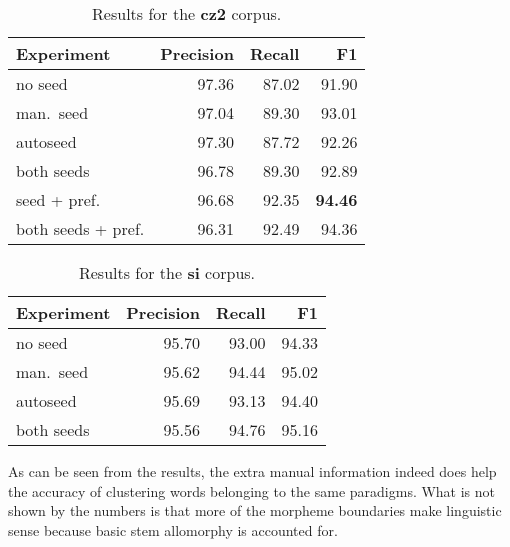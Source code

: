 \documentclass[11pt]{article}
\begin{document}
\begin{table}[h]
\begin{center}
\begin{tabular}{|l|r|r|r|}
\hline \bf Experiment & \bf Precision & \bf Recall & \bf F1\\ \hline
no seed & 97.36 & 87.02 & 91.90\\
man.~seed & 97.04 & 89.30 & 93.01 \\
autoseed & 97.30 & 87.72 & 92.26\\
both seeds & 96.78 & 89.30  & 92.89\\
seed + pref. & 96.68 & 92.35 & \bf 94.46\\
both seeds + pref. & 96.31 & 92.49 & 94.36\\
\hline
\end{tabular}
\end{center}
\caption{\label{table:res-cz2} Results for the \textbf{cz2} corpus.}
\end{table}

\begin{table}[h]
\begin{center}
\begin{tabular}{|l|r|r|r|}
\hline \bf Experiment & \bf Precision & \bf Recall & \bf F1\\ \hline
no seed & 95.70 & 93.00 & 94.33\\
man.~seed & 95.62 & 94.44 & 95.02 \\
autoseed & 95.69 & 93.13 & 94.40\\
both seeds & 95.56  & 94.76 & 95.16\\
\hline
\end{tabular}
\end{center}
\caption{\label{table:res-si} Results for the \textbf{si} corpus.}
\end{table}

As can be seen from the results, the extra manual information indeed does help the accuracy of clustering words belonging to the same paradigms.
What is not shown by the numbers is that more of the morpheme boundaries make linguistic sense because basic stem allomorphy is accounted for. 
\end{document}
